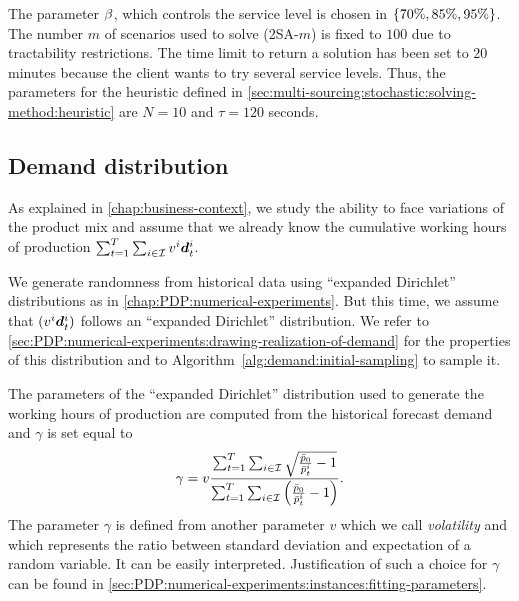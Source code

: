 The parameter $\beta$, which controls the service level is chosen in $\crbracket{70\%,85\%,95\%}$.
The number $m$ of scenarios used to solve (2SA-$m$) is fixed to $100$ due to tractability restrictions.
The time limit to return a solution has been set to $20$ minutes because the client wants to try several service levels.
Thus, the parameters for the heuristic defined in \cref{sec:multi-sourcing:stochastic:solving-method:heuristic} are $N=10$ and $\tau=120$ seconds.


\subsection{Demand distribution}
\label{sec:multi-sourcing:numerical-experiments:demand-distribution}




As explained in \cref{chap:business-context}, we study the ability to face variations of the product mix and assume that we already know the cumulative working hours of production $\sum_{t=1}^{\horizon}\sum_{i\in\REF}\rate^i\va\demand_t^i$.


We generate randomness from historical data using ``expanded Dirichlet'' distributions as in \cref{chap:PDP:numerical-experiments}.
But this time, we assume that $(\rate^i\va\demand_t^i)$ follows an ``expanded Dirichlet'' distribution.
We refer to \cref{sec:PDP:numerical-experiments:drawing-realization-of-demand} for the properties of this distribution and to Algorithm~\ref{alg:demand:initial-sampling} to sample it.


The parameters of the ``expanded Dirichlet'' distribution used to generate the working hours of production are computed from the historical forecast demand and $\gamma$ is set equal to
\begin{equation}
  \gamma
  =
  v\frac
  {\sum_{t=1}^{\horizon}\sum_{i\in\REF} \sqrt{\frac{\bar{p}_0}{\bar{p}_t^i}-1}}
  {\sum_{t=1}^{\horizon}\sum_{i\in\REF} \bracket{\frac{\bar{p}_0}{\bar{p}_t^i}-1}}.
\end{equation}
The parameter $\gamma$ is defined from another parameter $v$ which we call \emph{volatility} and which represents the ratio between standard deviation and expectation of a random variable.
It can be easily interpreted.
Justification of such a choice for $\gamma$ can be found in \cref{sec:PDP:numerical-experiments:instances:fitting-parameters}.


